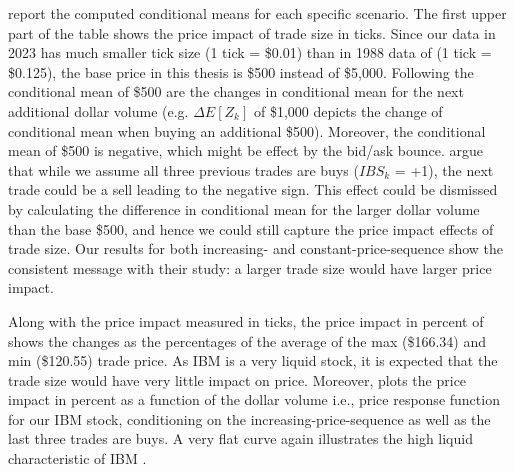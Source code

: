  report the computed conditional means for each specific scenario. The first upper part of the table shows the price impact of trade size in ticks. Since our data in 2023 has much smaller tick size (1 tick = \$0.01) than in 1988 data of \citet{hausman1992} (1 tick = \$0.125), the base price in this thesis is \$500 instead of \$5,000. Following the conditional mean of \$500 are the changes in conditional mean for the next additional dollar volume (e.g. \(\Delta E[Z_k]\) of \$1,000 depicts the change of conditional mean when buying an additional \$500). Moreover, the conditional mean of \$500 is negative, which might be effect by the bid/ask bounce. \citet{hausman1992} argue that while we assume all three previous trades are buys ($IBS_k$ = +1), the next trade could be a sell leading to the negative sign. This effect could be dismissed by calculating the difference in conditional mean for the larger dollar volume than the base \$500, and hence we could still capture the price impact effects of trade size. Our results for both increasing- and constant-price-sequence show the consistent message with their study: a larger trade size would have larger price impact.

Along with the price impact measured in ticks, the price impact in percent of  shows the changes as the percentages of the average of the max (\$166.34) and min (\$120.55) trade price. As IBM is a very liquid stock, it is expected that the trade size would have very little impact on price. Moreover,  plots the price impact  in percent as a function of the dollar volume i.e., price response function for our IBM stock, conditioning on the increasing-price-sequence as well as the last three trades are buys. A very flat curve again illustrates the high liquid characteristic of IBM \citep{hausman1992}.







